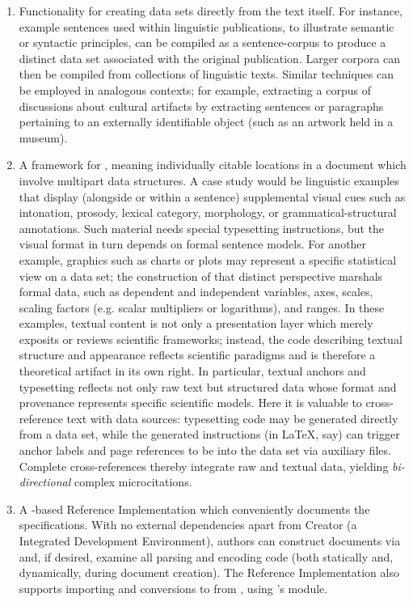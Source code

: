 {\begin{enumerate}
\item{} Functionality for creating data sets directly 
from the text itself.  For instance, example 
sentences used within linguistic publications, 
to illustrate semantic or syntactic principles, 
can be compiled as a sentence-corpus to produce 
a distinct data set associated with the 
original publication.  Larger corpora can then 
be compiled from collections of linguistic 
texts.  Similar techniques can be employed 
in analogous  contexts; 
for example, extracting a corpus of discussions 
about cultural artifacts by extracting sentences 
or paragraphs pertaining to an 
externally identifiable object (such as an 
artwork held in a museum).   

\item{} A framework for , meaning 
individually citable locations in a document which involve 
multipart data structures.  A case study would be linguistic 
examples that display (alongside or within a sentence) supplemental 
visual cues such as intonation, prosody, lexical category, 
morphology, or grammatical-structural annotations.  
Such material needs special typesetting instructions, but 
the visual format in turn depends on formal sentence 
models.  For another example, graphics such as charts 
or plots may represent a specific statistical 
view on a data set; the construction of that distinct 
perspective marshals formal data, such as dependent 
and independent variables, axes, scales, scaling 
factors (e.g. scalar multipliers or logarithms), and 
ranges.  In these examples, textual content is not only 
a presentation layer which merely exposits or 
reviews scientific frameworks; instead, 
the code describing textual structure and appearance 
reflects scientific paradigms and is therefore 
a theoretical artifact in its own right.
In particular, textual anchors and 
typesetting reflects not only raw text but structured 
data whose format and provenance represents specific 
scientific models.  Here it is valuable to 
cross-reference text with data sources:  
typesetting code may be generated directly from a 
data set, while the generated instructions (in \LaTeX{}, 
say) can trigger anchor labels and page references 
to be  into the data set via 
auxiliary files.  Complete cross-references 
thereby integrate raw and textual data, 
yielding \textit{bi-directional} complex microcitations.  
 
\item{} A \Qt{}-based Reference Implementation which conveniently 
documents the \HTXN{} specifications.  With no external 
dependencies apart from \Qt{} Creator (a \Cpp{} Integrated 
Development Environment), authors can construct \HTXN{} documents 
via \NGML{} and, if desired, examine all parsing and encoding code 
(both statically and, dynamically, during document creation).  
The Reference Implementation also supports importing and 
conversions to \HTXN{} from \XML{}, using \Qt{}'s \XML{} module. 


\end{enumerate}}
